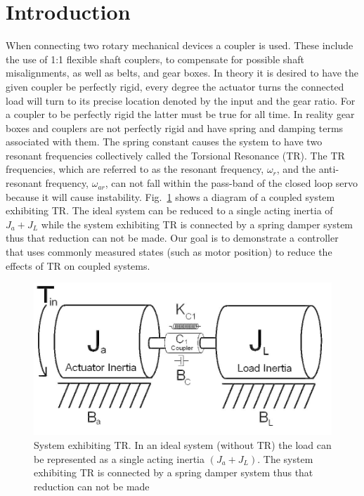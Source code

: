 \section{Introduction}

When connecting two rotary mechanical devices a coupler is used. These include the use of 1:1 flexible shaft couplers, to compensate for possible shaft misalignments, as well as belts, and gear boxes. In theory it is desired to have the given coupler be perfectly rigid, every degree the actuator turns the connected load will turn to its precise location denoted by the input and the gear ratio. For a coupler to be perfectly rigid the latter must be true for all time. In reality gear boxes and couplers are not perfectly rigid and have spring and damping terms associated with them. The spring constant causes the system to have two resonant frequencies collectively called the Torsional Resonance (TR). The TR frequencies, which are referred to as the resonant frequency, $\omega_r$, and the anti-resonant frequency, $\omega_{ar}$, can not fall within the pass-band of the closed loop servo because it will cause instability.  Fig.~\ref{fig:couple} shows a diagram of a coupled system exhibiting TR. The ideal system can be reduced to a single acting inertia of $J_a+J_L$ while the system exhibiting TR is connected by a spring damper system thus that reduction can not be made.  Our goal is to demonstrate a controller that uses commonly measured states (such as motor position) to reduce the effects of TR on coupled systems.

\begin{figure}[t]
  \centering
\includegraphics[width=1.0\columnwidth]{./pix/couple.png}
  \caption{System exhibiting TR. In an ideal
system (without TR) the load can be represented as a single acting inertia $(J_a+J_L)$.  The system exhibiting TR is connected by a
spring damper system thus that reduction can not be made\cite{lofaroTR}}
  \label{fig:couple}
\end{figure}

